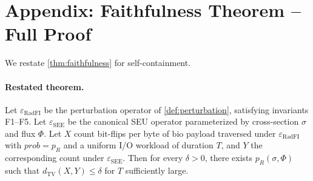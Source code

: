 \section{Appendix: Faithfulness Theorem -- Full Proof}\label{app:proof}

We restate \cref{thm:faithfulness} for self-containment.

\paragraph{Restated theorem.}
Let \(\varepsilon_{\text{RadFI}}\) be the perturbation operator of
\cref{def:perturbation}, satisfying invariants F1--F5. Let
\(\varepsilon_{\text{SEE}}\) be the canonical SEU operator
parameterized by cross-section \(\sigma\) and flux \(\Phi\). Let
\(X\) count bit-flips per byte of bio payload traversed under
\(\varepsilon_{\text{RadFI}}\) with \(\mathit{prob} = p_R\) and a
uniform I/O workload of duration \(T\), and \(Y\) the corresponding
count under \(\varepsilon_{\text{SEE}}\). Then for every
\(\delta > 0\), there exists \(p_R(\sigma, \Phi)\) such that
\(d_{\text{TV}}(X, Y) \leq \delta\) for \(T\) sufficiently large.

